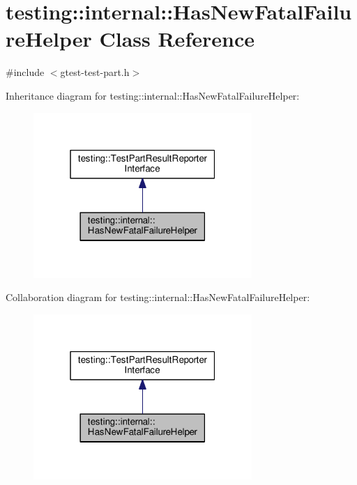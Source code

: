 \hypertarget{classtesting_1_1internal_1_1HasNewFatalFailureHelper}{}\section{testing\+:\+:internal\+:\+:Has\+New\+Fatal\+Failure\+Helper Class Reference}
\label{classtesting_1_1internal_1_1HasNewFatalFailureHelper}


{\ttfamily \#include $<$gtest-\/test-\/part.\+h$>$}



Inheritance diagram for testing\+:\+:internal\+:\+:Has\+New\+Fatal\+Failure\+Helper\+:
\nopagebreak
\begin{figure}[H]
\begin{center}
\leavevmode
\includegraphics[width=235pt]{classtesting_1_1internal_1_1HasNewFatalFailureHelper__inherit__graph}
\end{center}
\end{figure}


Collaboration diagram for testing\+:\+:internal\+:\+:Has\+New\+Fatal\+Failure\+Helper\+:
\nopagebreak
\begin{figure}[H]
\begin{center}
\leavevmode
\includegraphics[width=235pt]{classtesting_1_1internal_1_1HasNewFatalFailureHelper__coll__graph}
\end{center}
\end{figure}
